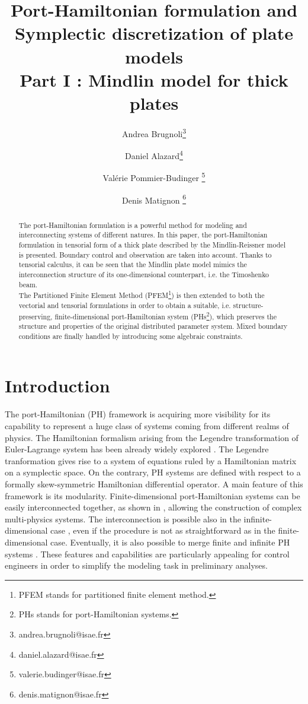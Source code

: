 \documentclass[11pt]{article}
\title{Port-Hamiltonian formulation and \\ Symplectic discretization of plate models\\
		Part I : Mindlin model for thick plates}
\author[1]{Andrea Brugnoli\thanks{andrea.brugnoli@isae.fr}}
\author[1]{Daniel Alazard\thanks{daniel.alazard@isae.fr}}
\author[1]{Val\'erie Pommier-Budinger \thanks{valerie.budinger@isae.fr}}
\author[1]{Denis Matignon \thanks{denis.matignon@isae.fr}}
\affil[1]{ISAE-SUPAERO, Universit\'e de Toulouse, France. \\
	10 Avenue Edouard Belin, BP-54032, 31055 Toulouse Cedex 4.}
\begin{document}
\maketitle
\begin{abstract}
The port-Hamiltonian formulation is a powerful method  for modeling and interconnecting systems of different natures. In this paper, the port-Hamiltonian formulation in tensorial form of a thick plate described  by the Mindlin-Reissner model is presented. Boundary control and observation are taken into account. Thanks to tensorial calculus, it can be seen that the Mindlin plate model mimics the interconnection structure of its one-dimensional counterpart, i.e. the Timoshenko beam.\\
The Partitioned Finite Element Method (PFEM\footnote{PFEM stands for partitioned finite element method.}) is then extended to both the vectorial and tensorial formulations in order to obtain a suitable, i.e. structure-preserving, finite-dimensional port-Hamiltonian system (PHs\footnote{PHs stands for port-Hamiltonian systems.}), which preserves the structure and properties of the original distributed parameter system. Mixed boundary conditions are finally handled by introducing some algebraic constraints. 
\end{abstract}
		
	\section*{Introduction}
	The port-Hamiltonian (PH) framework is acquiring more visibility for its capability to represent a huge class of systems coming from different realms of physics. {The Hamiltonian formalism arising from the Legendre transformation of Euler-Lagrange system  has been already widely explored \cite{SymplecticElasticity}. The Legendre tranformation gives rise to a system of equations ruled by a Hamiltonian matrix on a symplectic space. On the contrary,  PH systems are defined with respect to a formally skew-symmetric Hamiltonian differential operator.} A main feature of this framework is its modularity. Finite-dimensional port-Hamiltonian systems can be easily interconnected together, as shown in \cite{Cervera2007}, allowing the construction of complex multi-physics systems. The interconnection is possible also in the infinite-dimensional case \cite{ShaftIntInfinite}, even if the procedure is not as straightforward as in the finite-dimensional case. Eventually, it is also possible to merge finite and infinite PH systems \cite{vanderShaftintFinInf}. These features and capabilities are particularly appealing for control engineers in order to simplify the modeling task in preliminary analyses.  \\
	
\end{document}
